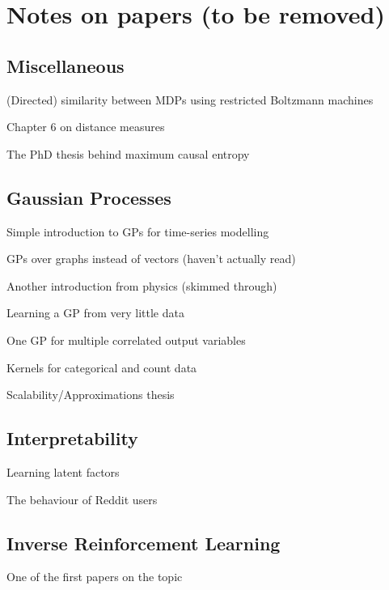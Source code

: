 \documentclass{mprop}
\theoremstyle{definition}
\begin{document}
\section{Notes on papers (to be removed)}

\subsection{Miscellaneous}

(Directed) similarity between MDPs using restricted Boltzmann machines
\cite{9401f4eeb9a64c77afb3d087261d1080}

Chapter 6 on distance measures \cite{mccune2002analysis}

The PhD thesis behind maximum causal entropy \cite{Ziebart:2010:MPA:2049078}

\subsection{Gaussian Processes}

Simple introduction to GPs for time-series modelling \cite{Roberts2013GaussianPF}

GPs over graphs instead of vectors (haven't actually read)
\cite{DBLP:journals/corr/abs-1803-05776}

Another introduction from physics (skimmed through) \cite{introduction_to_gps}

Learning a GP from very little data \cite{DBLP:conf/nips/PlattBSWZ01}

One GP for multiple correlated output variables \cite{DBLP:journals/jcphy/BilionisZKL13}

Kernels for categorical and count data \cite{savitsky2011variable}

Scalability/Approximations thesis \cite{kth}

\subsection{Interpretability}

Learning latent factors \cite{DBLP:conf/nips/LiSE17}

The behaviour of Reddit users \cite{DBLP:conf/atal/DasL14}

\subsection{Inverse Reinforcement Learning}

One of the first papers on the topic \cite{DBLP:conf/icml/NgR00}
\end{document}
